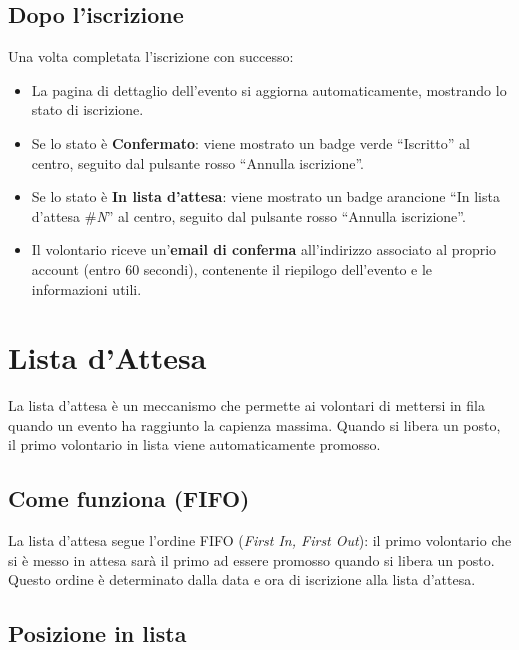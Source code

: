\documentclass[a4paper,11pt,oneside]{book}
\begin{document}
\subsection{Dopo l'iscrizione}

Una volta completata l'iscrizione con successo:

\begin{itemize}[leftmargin=1.5em]
  \item La pagina di dettaglio dell'evento si aggiorna automaticamente, mostrando lo stato di iscrizione.
  \item Se lo stato \`e \textbf{Confermato}: viene mostrato un badge verde ``Iscritto'' al centro, seguito dal pulsante rosso ``Annulla iscrizione''.
  \item Se lo stato \`e \textbf{In lista d'attesa}: viene mostrato un badge arancione ``In lista d'attesa \#\textit{N}'' al centro, seguito dal pulsante rosso ``Annulla iscrizione''.
  \item Il volontario riceve un'\textbf{email di conferma} all'indirizzo associato al proprio account (entro 60 secondi), contenente il riepilogo dell'evento e le informazioni utili.
\end{itemize}

\section{Lista d'Attesa}
\label{sec:lista-attesa}

La lista d'attesa \`e un meccanismo che permette ai volontari di mettersi in fila quando un evento ha raggiunto la capienza massima. Quando si libera un posto, il primo volontario in lista viene automaticamente promosso.

\subsection{Come funziona (FIFO)}

La lista d'attesa segue l'ordine FIFO (\textit{First In, First Out}): il primo volontario che si \`e messo in attesa sar\`a il primo ad essere promosso quando si libera un posto. Questo ordine \`e determinato dalla data e ora di iscrizione alla lista d'attesa.

\subsection{Posizione in lista}
\end{document}
